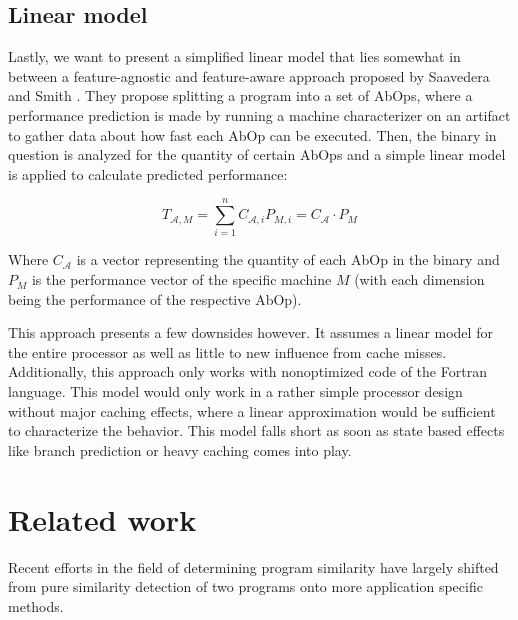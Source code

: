 \documentclass[../bachelor_paper.tex]{subfiles}
\begin{document}
\subsection{Linear model}
Lastly, we want to present a simplified linear model that lies somewhat in between a feature-agnostic and feature-aware approach proposed by Saavedera and Smith \cite{saavedraAnalysisBenchmarkCharacteristics1996}. They propose splitting a program into a set of \acp{AbOp}, where a performance prediction is made by running a machine characterizer on an artifact to gather data about how fast each \ac{AbOp} can be executed. Then, the binary in question is analyzed for the quantity of certain \acp{AbOp} and a simple linear model is applied to calculate predicted performance:

\begin{equation}
\label{eq:theo/simi/hybr/mode}
T_{\mathcal{A},M} = \sum^n_{i = 1}C_{\mathcal{A},i}P_{M,i} = C_\mathcal{A} \cdot P_M
\end{equation}

Where $C_{\mathcal{A}}$ is a vector representing the quantity of each \ac{AbOp} in the binary and $P_{M}$ is the performance vector of the specific machine $M$ (with each dimension being the performance of the respective \ac{AbOp}).

This approach presents a few downsides however. It assumes a linear model for the entire processor as well as little to new influence from cache misses. Additionally, this approach only works with nonoptimized code of the Fortran language. This model would only work in a rather simple processor design without major caching effects, where a linear approximation would be sufficient to characterize the behavior. This model falls short as soon as state based effects like branch prediction or heavy caching comes into play.

\section{Related work}
	\label{sec:prob/rel}

Recent efforts in the field of determining program similarity have largely shifted from pure similarity detection of two programs onto more application specific methods. 
\end{document}
